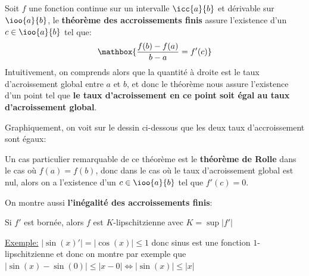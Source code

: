 \subsection*{}

Soit \(f\) une fonction continue sur un intervalle \(\icc{a}{b}\) et dérivable sur \(\ioo{a}{b}\), le \textbf{théorème des accroissements finis} assure l'existence d'un \(c \in \ioo{a}{b}\) tel que:
\[
   \mathbox{\frac{f(b) - f(a)}{b - a} = f'(c)}   
\]
Intuitivement, on comprends alors que la quantité à droite est le taux d'acroissement global entre \(a\) et \(b\), et donc le théorème nous assure l'existence d'un point tel que \textbf{le taux d'acroissement en ce point soit égal au taux d'acroissement global}.
\pagebreak

Graphiquement, on voit sur le dessin ci-dessous que les deux taux d'accroissement sont égaux:
\begin{center}
\end{center}
Un cas particulier remarquable de ce théorème est le \textbf{théorème de Rolle} dans le cas où \(f(a) = f(b)\), donc dans le cas où le taux d'acroissement global est nul, alors on a l'existence d'un \(c \in \ioo{a}{b}\) tel que \(f'(c) = 0\).\<

On montre aussi \textbf{l'inégalité des accroissements finis}:
\begin{center}
   Si \(f'\) est bornée, alors \(f\) est \(K\)-lipschitzienne avec \(K = \sup|f'|\)
\end{center}
\underline{Exemple:} \(|\sin(x)'| = |\cos(x)| \leq 1\) donc sinus est une fonction \(1\)-lipschitzienne et donc on montre par exemple que \(|\sin(x) - \sin(0)| \leq |x - 0| \Longleftrightarrow |\sin(x)| \leq |x|\)

